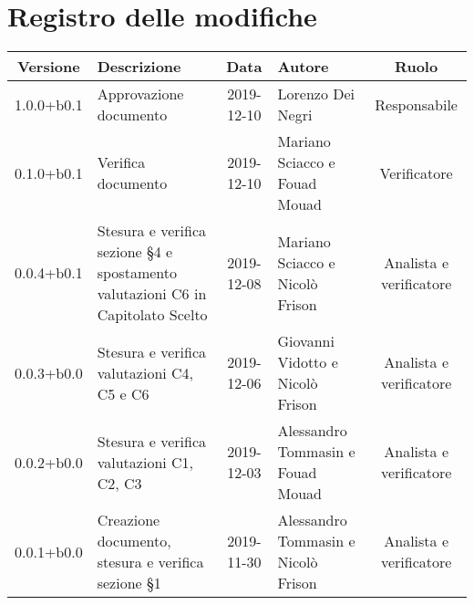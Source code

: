 \section*{Registro delle modifiche}

\begin{center}
	\begin{longtable}{|c|p{3cm}|c|p{4cm}|c|}
	\hline
	\rowcolor{lighter-grayer}
	\textbf{Versione} & \textbf{Descrizione} & \textbf{Data} & \textbf{Autore} & \textbf{Ruolo} \\
	\hline
	\endfirsthead

	1.0.0+b0.1 & Approvazione documento & 2019-12-10 & Lorenzo Dei Negri & Responsabile \\
	\hline
	0.1.0+b0.1 & Verifica documento & 2019-12-10 & Mariano Sciacco e Fouad Mouad & Verificatore \\
	\hline
	0.0.4+b0.1 & Stesura e verifica sezione \S4 e spostamento valutazioni C6 in Capitolato Scelto & 2019-12-08 & Mariano Sciacco e Nicolò Frison & Analista e verificatore \\
	\hline
	0.0.3+b0.0 & Stesura e verifica valutazioni C4, C5 e C6 & 2019-12-06 & Giovanni Vidotto e Nicolò Frison & Analista e verificatore \\
	\hline
	0.0.2+b0.0 & Stesura e verifica valutazioni C1, C2, C3 & 2019-12-03 & Alessandro Tommasin e Fouad Mouad & Analista e verificatore \\
	\hline
	0.0.1+b0.0 & Creazione documento, stesura e verifica sezione \S1 & 2019-11-30 & Alessandro Tommasin e Nicolò Frison & Analista e verificatore \\
	\hline

	\end{longtable}
\end{center}

